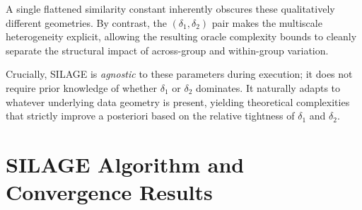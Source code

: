 \documentclass{article}
\theoremstyle{plain}
\newcommand{\algname}[1]{{\sf\scalefont{0.88}\color{mydarkgreen}#1}\xspace}
\def\algname#1{#1}%
\begin{document}
A single flattened similarity constant inherently obscures these qualitatively different geometries. By contrast, the $(\delta_1,\delta_2)$ pair makes the multiscale heterogeneity explicit, allowing the resulting oracle complexity bounds to cleanly separate the structural impact of across-group and within-group variation.

Crucially, \algname{SILAGE} is %
 \emph{agnostic} to these parameters during execution; it does not require prior knowledge of whether $\delta_1$ or $\delta_2$ dominates. It naturally adapts to whatever underlying data geometry is present, yielding theoretical complexities that strictly improve a posteriori based on the relative tightness of $\delta_1$ and $\delta_2$.

\section{\algname{SILAGE} Algorithm and Convergence Results}
\label{sec:silage_algorithms}
\end{document}
